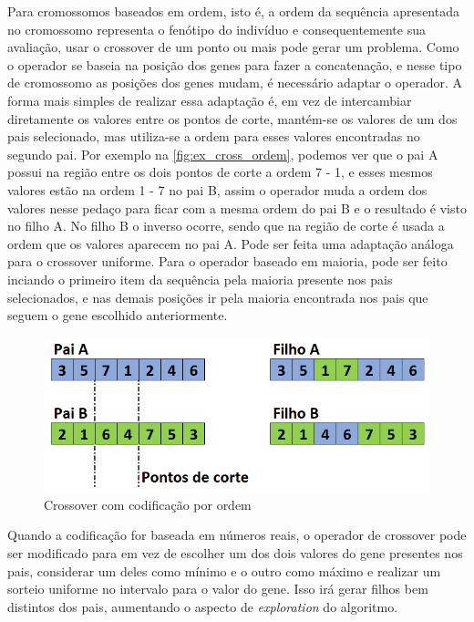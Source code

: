 Para cromossomos baseados em ordem, isto é, a ordem da sequência apresentada no cromossomo representa o fenótipo do indivíduo e consequentemente sua avaliação, usar o crossover de um ponto ou mais pode gerar um problema. Como o operador se baseia na posição dos genes para fazer a concatenação, e nesse tipo de cromossomo as posições dos genes mudam, é necessário adaptar o operador. A forma mais simples de realizar essa adaptação é, em vez de intercambiar diretamente os valores entre os pontos de corte, mantém-se os valores de um dos pais selecionado, mas utiliza-se a ordem para esses valores encontradas no segundo pai. Por exemplo na \autoref{fig:ex_cross_ordem}, podemos ver que o pai A possui na região entre os dois pontos de corte a ordem 7 - 1, e esses mesmos valores estão na ordem 1 - 7 no pai B, assim o operador muda a ordem dos valores nesse pedaço para ficar com a mesma ordem do pai B e o resultado é visto no filho A. No filho B o inverso ocorre, sendo que na região de corte é usada a ordem que os valores aparecem no pai A. Pode ser feita uma adaptação análoga para o crossover uniforme. Para o operador baseado em maioria, pode ser feito inciando o primeiro item da sequência pela maioria presente nos pais selecionados, e nas demais posições ir pela maioria encontrada nos pais que seguem o gene escolhido anteriormente.

\begin{figure}[ht]
	\centering
	\includegraphics[width=0.75\linewidth]{imagens/exemplo_cross_ordem.png}
	\caption{Crossover com codificação por ordem}
	\label{fig:ex_cross_ordem}
\end{figure}

Quando a codificação for baseada em números reais, o operador de crossover pode ser modificado para em vez de escolher um dos dois valores do gene presentes nos pais, considerar um deles como mínimo e o outro como máximo e realizar um sorteio uniforme no intervalo para o valor do gene. Isso irá gerar filhos bem distintos dos pais, aumentando o aspecto de \textit{exploration} do algoritmo.

